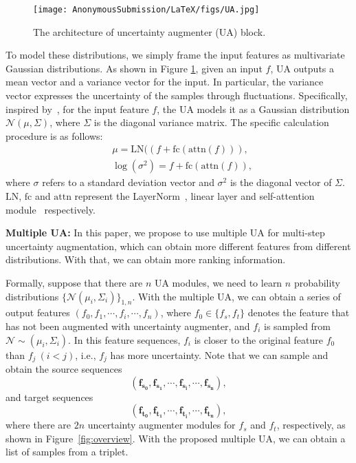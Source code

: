 \documentclass[letterpaper]{article} \usepackage{aaai24}  \usepackage{times}  \usepackage{helvet}  \usepackage{courier}  \usepackage[hyphens]{url}  \usepackage{graphicx} \urlstyle{rm} \def\UrlFont{\rm}  \usepackage{natbib}  \usepackage{caption} \frenchspacing  \setlength{\pdfpagewidth}{8.5in} \setlength{\pdfpageheight}{11in} \usepackage{amsmath,amsfonts}
\begin{document}
\begin{figure}
    \centering
    \texttt{[image: AnonymousSubmission/LaTeX/figs/UA.jpg]}
    \caption{The architecture of uncertainty augmenter (UA) block.}
    \label{fig:ua}
\end{figure}

To model these distributions, we simply frame the input features as multivariate Gaussian distributions. As shown in Figure \ref{fig:ua}, given an input $f$, UA outputs a mean vector and a variance vector for the input. In particular, the variance vector expresses the uncertainty of the samples through fluctuations. Specifically, inspired by~\cite{chun2021probabilistic, neculai2022probabilistic}, for the input feature $f$, the UA models it as a Gaussian distribution $\mathcal{N}\left( \mu, \Sigma \right)$, where $\Sigma$ is the diagonal variance matrix. The specific calculation procedure is as follows:
\begin{equation}
    \begin{aligned}
    &\mu=\mathrm{LN}((f+\mathrm{fc}(\mathrm{attn}(f))),\\
    &\log(\sigma^2)=f+\mathrm{fc}(\mathrm{attn}(f)),
    \end{aligned}
\end{equation}
where $\sigma$ refers to a standard deviation vector and $\sigma^2$ is the diagonal vector of $\Sigma$. $\mathrm{LN}$, $\mathrm{fc}$ and $\mathrm{attn}$ represent the LayerNorm~\cite{ba2016layer}, linear layer and self-attention module~\cite{lin2017structured} respectively. 

\textbf{Multiple UA:}
In this paper, we propose to use multiple UA for multi-step uncertainty augmentation, which can obtain more different features from different distributions. With that, we can obtain more ranking information. 

Formally, suppose that there are $n$ UA modules, we need to learn $n$ probability distributions $\{\mathcal{N}(\mu_i, \Sigma_i)\}_{1,n}$. With the multiple UA, we can obtain a series of output features $\left(f_0, f_1, \cdots, f_i, \cdots,f_n\right)$, where $f_0 \in \{f_s,f_ t\}$ denotes the feature that has not been augmented with uncertainty augmenter, and $f_i$ is sampled from $\mathcal{N}\sim(\mu_i, \Sigma_i)$. In this feature sequences, $f_i$ is closer to the original feature $f_0$ than $f_j\ (i < j)$, i.e., $f_j$ has more uncertainty. Note that we can sample and obtain the source sequences 
\begin{equation}
   \boldsymbol{ \left(f_{s_0}, f_{s_1}, \cdots, f_{s_i}, \cdots,f_{s_n}\right) },
\end{equation}
and target sequences 
\begin{equation}
    \boldsymbol{ \left(f_{t_0}, f_{t_1}, \cdots, f_{t_i}, \cdots,f_{t_n}\right)},
\end{equation}
where there are $2n$ uncertainty augmenter modules for $f_s$ and $f_t$, respectively, as shown in Figure~\ref{fig:overview}. With the proposed multiple UA, we can obtain a list of samples from a triplet. 
\end{document}
